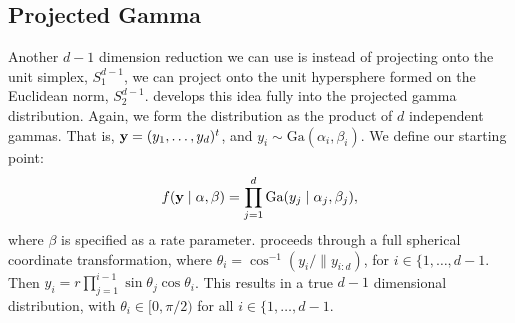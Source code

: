 \subsection{Projected Gamma}
\label{method:pg}
Another $d-1$ dimension reduction we can use is instead of projecting onto the unit simplex,
  $S_{1}^{d-1}$, we can project onto the unit hypersphere formed on the Euclidean norm,
  $S_{2}^{d-1}$. \cite{nunez2019} develops this idea fully into the projected gamma distribution.
  Again, we form the distribution as the product of $d$ independent gammas.  That is,
  ${\bf y} = (y_1,\ldots,y_d)^t$, and $y_i\sim\text{Ga}(\alpha_i,\beta_i)$.  We define our
  starting point:
  \begin{equation}
    f({\bf y}\mid{\bf \alpha},{\bf \beta}) = \prod_{j = 1}^d\text{Ga}(y_j\mid\alpha_j,\beta_j),
  \end{equation}
  where $\beta$ is specified as a rate parameter.  \cite{nunez2019} proceeds through a full
  spherical coordinate transformation, where $\theta_i = \cos^{-1}(y_i / \lVert y_{i:d})$,
  for $i\in\lbrace1,\ldots,d-1$.  Then $y_i = r\prod_{j=1}^{i-1}\sin\theta_j\cos\theta_i$.
  This results in a true $d-1$ dimensional distribution, with $\theta_i \in [0, \pi/2)$ for all
  $i\in\lbrace1,\ldots,d-1$.


